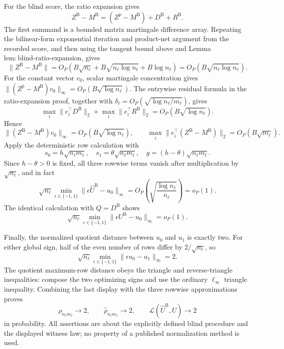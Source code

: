 For the blind score, the ratio expansion gives
\[
 Z^{\mathrm B}-M^{\mathrm B}
 =(Z^{\bar p}-M^{\mathrm B})+D^{\mathrm B}+R^{\mathrm B}.
\]
The first summand is a bounded matrix martingale difference array.  Repeating the bilinear-form exponential iteration and product-net argument from the recorded score, and then using the tangent bound above and Lemma \(\mathrm{lem:blind\mbox{-}ratio\mbox{-}expansion}\), gives
\[
 \lVert Z^{\mathrm B}-M^{\mathrm B}\rVert
 =O_P(B\sqrt{n_\ell}+B\sqrt{n_\ell\log n_\ell}+B\log n_\ell)
 =O_P(B\sqrt{n_\ell\log n_\ell}).
\]
For the constant vector \(v_0\), scalar martingale concentration gives
\(\lVert(Z^{\bar p}-M^{\mathrm B})v_0\rVert_\infty
=O_P(B\sqrt{\log n_\ell})\).  The entrywise residual formula in the ratio-expansion proof, together with \(\delta_\ell=O_P(\sqrt{\log n_\ell/m_\ell})\), gives
\[
 \max_i\lVert e_i^\top D^{\mathrm B}\rVert_2
 +\max_i\lVert e_i^\top R^{\mathrm B}\rVert_2
 =O_P(B\sqrt{\log n_\ell}).
\]
Hence
\[
 \lVert(Z^{\mathrm B}-M^{\mathrm B})v_0\rVert_\infty
 =O_P(B\sqrt{\log n_\ell}),
 \qquad
 \max_i\lVert e_i^\top(Z^{\mathrm B}-M^{\mathrm B})\rVert_2
 =O_P(B\sqrt{m_\ell}).
\]
Apply the deterministic row calculation with
\[
 s_0=h\sqrt{n_\ell m_\ell},\quad
 s_1=\theta\sqrt{n_\ell m_\ell},\quad
 g=(h-\theta)\sqrt{n_\ell m_\ell}.
\]
Since \(h-\theta>0\) is fixed, all three rowwise terms vanish after multiplication by \(\sqrt{n_\ell}\), and in fact
\[
 \sqrt{n_\ell}\min_{\epsilon\in\{-1,1\}}
 \lVert\epsilon\widehat U^{\mathrm B}-u_0\rVert_\infty
 =O_P\!\left(\sqrt{\frac{\log n_\ell}{n_\ell}}\right)=o_P(1).
\]
The identical calculation with \(Q=D^{\mathrm B}\) shows
\[
 \sqrt{n_\ell}\min_{\epsilon\in\{-1,1\}}
 \lVert\epsilon U^{\mathrm B}-u_0\rVert_\infty=o_P(1).
\]

Finally, the normalized quotient distance between \(u_0\) and \(u_1\) is exactly two.  For either global sign, half of the even number of rows differ by \(2/\sqrt{n_\ell}\), so
\[
 \sqrt{n_\ell}\min_{\epsilon\in\{-1,1\}}
 \lVert\epsilon u_0-u_1\rVert_\infty=2.
\]
The quotient maximum-row distance obeys the triangle and reverse-triangle inequalities: compose the two optimizing signs and use the ordinary \(\ell_\infty\) triangle inequality.  Combining the last display with the three rowwise approximations proves
\[
 \rho_{n_\ell m_\ell}\longrightarrow2,
 \qquad
 \widehat\rho_{n_\ell m_\ell}\longrightarrow2,
 \qquad
 \mathcal L(\widehat U^{\mathrm B},U)\longrightarrow2
\]
in probability.  All assertions are about the explicitly defined blind procedure and the displayed witness law; no property of a published normalization method is used.
